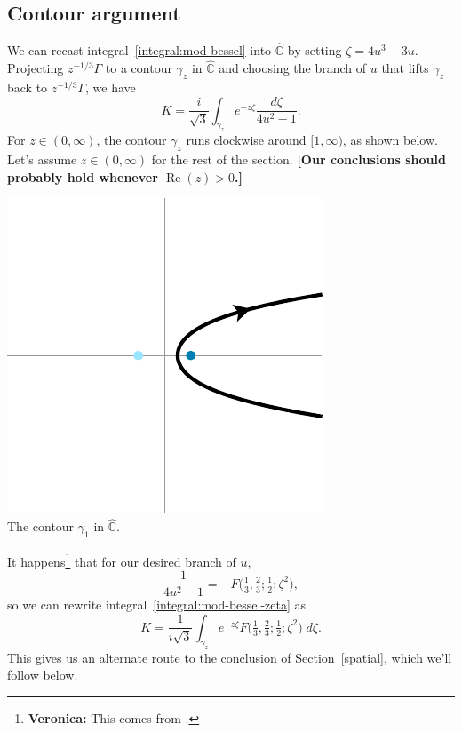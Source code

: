 \documentclass{article}
\theoremstyle{plain}
\newcommand{\C}{\mathbb{C}}
\begin{document}
\subsection{Contour argument}\label{contour-argument}
We can recast integral~\ref{integral:mod-bessel} into $\hat{\C}$ by setting $\zeta = 4u^3 - 3u$. Projecting $z^{-1/3} \Gamma$ to a contour $\gamma_z$ in $\hat{\C}$ and choosing the branch of $u$ that lifts $\gamma_z$ back to $z^{-1/3} \Gamma$, we have
\begin{equation}\label{integral:mod-bessel-zeta}
K = \frac{i}{\sqrt{3}} \int_{\gamma_z} e^{-z\zeta}\frac{d\zeta}{4u^2 - 1}.
\end{equation}
For $z \in (0, \infty)$, the contour $\gamma_z$ runs clockwise around $[1, \infty)$, as shown below. Let's assume $z \in (0, \infty)$ for the rest of the section. \textbf{[Our conclusions should probably hold whenever $\operatorname{Re}(z) > 0$.]}
\begin{center}
\includegraphics{figures/zeta_contour_3.pdf} \\[1em]
{\small The contour $\gamma_1$ in $\hat{\C}$.}
\end{center}

It happens\footnote{\textbf{Veronica:} This comes from \cite[equation~15.4.14]{dlmf}.} that for our desired branch of $u$,
\[ \frac{1}{4u^2 - 1} = -F\big(\tfrac{1}{3}, \tfrac{2}{3}; \tfrac{1}{2}; \zeta^2\big), \]
so we can rewrite integral~\ref{integral:mod-bessel-zeta} as
\[ K = \frac{1}{i\sqrt{3}} \int_{\gamma_z} e^{-z\zeta} F\big(\tfrac{1}{3}, \tfrac{2}{3}; \tfrac{1}{2}; \zeta^2\big)\;d\zeta. \]
This gives us an alternate route to the conclusion of Section~\ref{spatial}, which we'll follow below.
\end{document}
